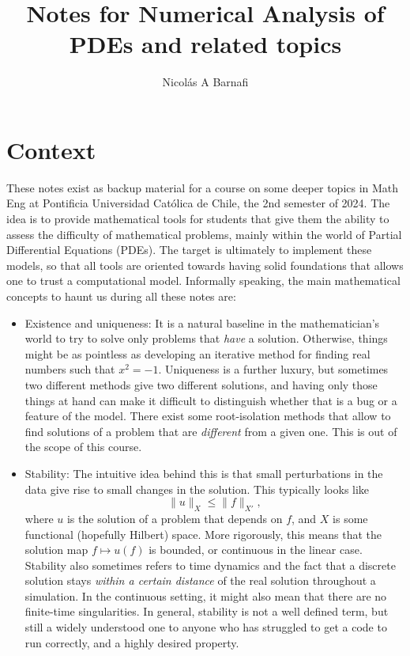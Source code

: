 \documentclass{article}
\title{Notes for Numerical Analysis of PDEs and related topics}
\author{Nicol\'as A Barnafi}
\begin{document}
\maketitle

\section*{Context}

These notes exist as backup material for a course on some deeper topics in Math Eng at Pontificia Universidad Católica de Chile, the 2nd semester of 2024. The idea is to provide mathematical tools for students that give them the ability to assess the difficulty of mathematical problems, mainly within the world of Partial Differential Equations (PDEs). The target is ultimately to implement these models, so that all tools are oriented towards having solid foundations that allows one to trust a computational model. Informally speaking, the main mathematical concepts to haunt us during all these notes are: 
    \begin{itemize}
        \item Existence and uniqueness: It is a natural baseline in the mathematician's world to try to solve only problems that \emph{have} a solution. Otherwise, things might be as pointless as developing an iterative method for finding real numbers such that $x^2 = -1$. Uniqueness is a further luxury, but sometimes two different methods give two different solutions, and having only those things at hand can make it difficult to distinguish whether that is a bug or a feature of the model. There exist some root-isolation methods that allow to find solutions of a problem that are \emph{different} from a given one. This is out of the scope of this course. 
        \item Stability: The intuitive idea behind this is that small perturbations in the data give rise to small changes in the solution. This typically looks like 
            $$ \| u\|_X \leq \| f\|_{X'}, $$
        where $u$ is the solution of a problem that depends on $f$, and $X$ is some functional (hopefully Hilbert) space. More rigorously, this means that the solution map $f \mapsto u(f)$ is bounded, or continuous in the linear case. Stability also sometimes refers to time dynamics and the fact that a discrete solution stays \emph{within a certain distance} of the real solution throughout a simulation. In the continuous setting, it might also mean that there are no finite-time singularities. In general, stability is not a well defined term, but still a widely understood one to anyone who has struggled to get a code to run correctly, and a highly desired property. 
    \end{itemize}
\end{document}
